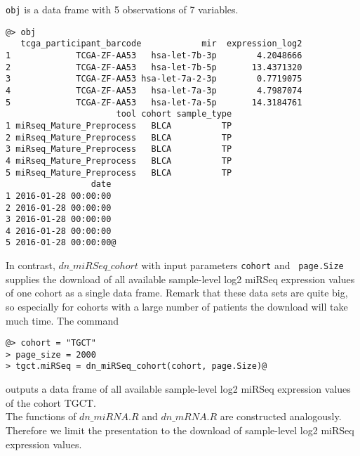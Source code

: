 \documentclass{TechReport}
\begin{document}
{\tt obj} is a data frame with 5 observations of 7 variables.
\begin{lstlisting}[style=base]
@> obj
   tcga_participant_barcode            mir  expression_log2
1             TCGA-ZF-AA53   hsa-let-7b-3p        4.2048666
2             TCGA-ZF-AA53   hsa-let-7b-5p       13.4371320
3             TCGA-ZF-AA53 hsa-let-7a-2-3p        0.7719075
4             TCGA-ZF-AA53   hsa-let-7a-3p        4.7987074
5             TCGA-ZF-AA53   hsa-let-7a-5p       14.3184761
                      tool cohort sample_type                              
1 miRseq_Mature_Preprocess   BLCA          TP 
2 miRseq_Mature_Preprocess   BLCA          TP 
3 miRseq_Mature_Preprocess   BLCA          TP 
4 miRseq_Mature_Preprocess   BLCA          TP 
5 miRseq_Mature_Preprocess   BLCA          TP 
                 date
1 2016-01-28 00:00:00
2 2016-01-28 00:00:00
3 2016-01-28 00:00:00
4 2016-01-28 00:00:00
5 2016-01-28 00:00:00@
\end{lstlisting}
In contrast, $dn\_miRSeq\_cohort$ with input parameters {\tt cohort} and {\tt
page.Size} supplies the download of all available sample-level log2 miRSeq
expression 
values of one cohort as a single data frame. 
Remark that these data sets are quite big, so especially for cohorts with a large
number of patients the download will take much time. The command
\begin{lstlisting}[style=base]
@> cohort = "TGCT"
> page_size = 2000
> tgct.miRSeq = dn_miRSeq_cohort(cohort, page.Size)@
\end{lstlisting}
outputs a data frame of all available sample-level log2 miRSeq expression values of
the cohort TGCT. \\
The functions of $dn\_miRNA.R$ and $dn\_mRNA.R$ are constructed analogously.
Therefore we limit the presentation to the download of sample-level 
log2 miRSeq expression values. 
\end{document}
